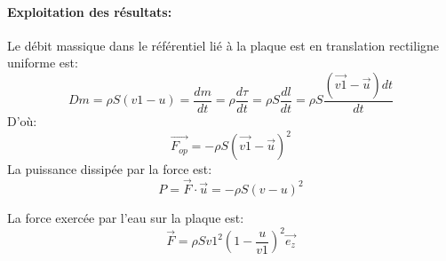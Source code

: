 \documentclass[10pt,a4paper]{article}
\begin{document}
\paragraph{Exploitation des résultats:} Le débit massique dans le référentiel lié à la plaque est en translation rectiligne uniforme est:
\[ Dm = \rho S (v1 - u) = \frac{dm}{dt} = \rho \frac{d\tau}{dt} = \rho S \frac{dl}{dt} = \rho S \frac{(\vec{v1}-\vec{u}) dt}{dt}\]
D'où:
\[ \vec{F_{op}} = -\rho S (\vec{v1} - \vec{u})^{2}\]
La puissance dissipée par la force est:
\[ P = \vec{F}\cdot\vec{u} = -\rho S (v - u)^{2}\]

La force exercée par l'eau sur la plaque est:
\[\vec{F} = \rho S v1^{2} (1 - \frac{u}{v1})^{2}\vec{e_{z}}\]




\newpage


\end{document}
